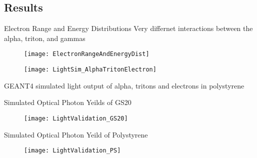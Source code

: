 \subsection{Results}
\begin{frame}{Electron Range and Energy Distributions}
  Very differnet interactions between the alpha, triton, and gammas
  \begin{figure}
    \centering
    \texttt{[image: ElectronRangeAndEnergyDist]}
  \end{figure}
\end{frame}
\begin{frame}
  \begin{figure}
    \centering
    \texttt{[image: LightSim\_AlphaTritonElectron]}
  \end{figure}
  GEANT4 simulated light output of alpha, tritons and electrons in polystyrene
  \hyperlink{ScintEnergyDep}{}
\end{frame}
\begin{frame}{Simulated Optical Photon Yeilds of GS20}
  \begin{figure}
    \centering
    \texttt{[image: LightValidation\_GS20]}
  \end{figure}
\end{frame}
\begin{frame}{Simulated Optical Photon Yeild of Polystyrene}
  \begin{figure}
    \centering
    \texttt{[image: LightValidation\_PS]}
  \end{figure}
  \vspace{2.5cm}
\end{frame}
